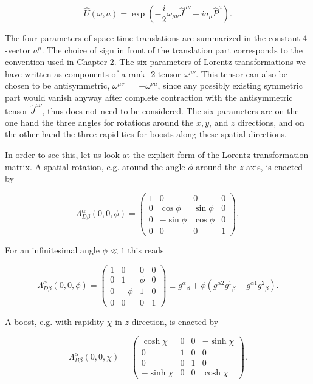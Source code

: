 \documentclass[10pt, letterpaper]{article}
\begin{document}
$$
\hat{U}(\omega, a)=\exp \left(-\frac{i}{2} \omega_{\mu \nu} \hat{J}^{\mu \nu}+i a_{\mu} \hat{P}^{\mu}\right) .
$$

The four parameters of space-time translations are summarized in the constant 4 -vector $a^{\mu}$. The choice of sign in front of the translation part corresponds to the convention used in Chapter 2. The six parameters of Lorentz transformations we have written as components of a rank- 2 tensor $\omega^{\mu \nu}$. This tensor can also be chosen to be antisymmetric, $\omega^{\mu \nu}=$ $-\omega^{\nu \mu}$, since any possibly existing symmetric part would vanish anyway after complete contraction with the antisymmetric tensor $\hat{J}^{\mu \nu}$, thus does not need to be considered. The six parameters are on the one hand the three angles for rotations around the $x, y$, and $z$ directions, and on the other hand the three rapidities for boosts along these spatial directions.

In order to see this, let us look at the explicit form of the Lorentz-transformation matrix. A spatial rotation, e.g. around the angle $\phi$ around the $z$ axis, is enacted by

$$
\Lambda_{D \beta}^{\alpha}(0,0, \phi)=\left(\begin{array}{cccc}
1 & 0 & 0 & 0 \\
0 & \cos \phi & \sin \phi & 0 \\
0 & -\sin \phi & \cos \phi & 0 \\
0 & 0 & 0 & 1
\end{array}\right),
$$

For an infinitesimal angle $\phi \ll 1$ this reads

$$
\Lambda_{D \beta}^{\alpha}(0,0, \phi)=\left(\begin{array}{cccc}
1 & 0 & 0 & 0 \\
0 & 1 & \phi & 0 \\
0 & -\phi & 1 & 0 \\
0 & 0 & 0 & 1
\end{array}\right) \equiv g^{\alpha}{ }_{\beta}+\phi\left(g^{\alpha 2} g^{1}{ }_{\beta}-g^{\alpha 1} g^{2}{ }_{\beta}\right) .
$$

A boost, e.g. with rapidity $\chi$ in $z$ direction, is enacted by

$$
\Lambda_{B \beta}^{\alpha}(0,0, \chi)=\left(\begin{array}{cccc}
\cosh \chi & 0 & 0 & -\sinh \chi \\
0 & 1 & 0 & 0 \\
0 & 0 & 1 & 0 \\
-\sinh \chi & 0 & 0 & \cosh \chi
\end{array}\right) .
$$
\end{document}
